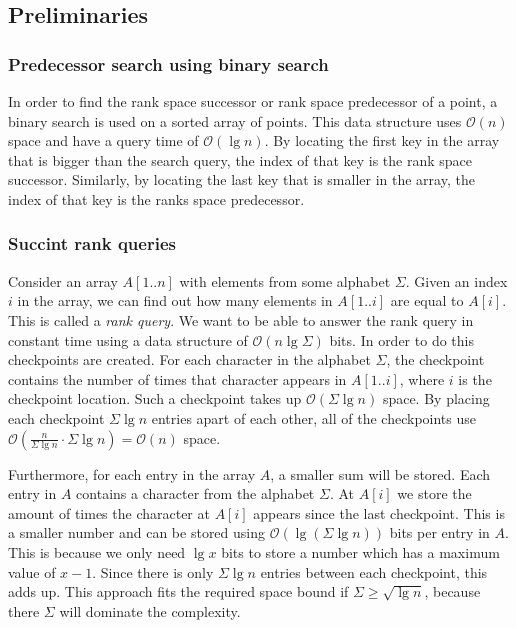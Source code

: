 \subsection{Preliminaries}

\subsubsection{Predecessor search using binary search}
In order to find the rank space successor or rank space predecessor of a point, a binary search is used on a sorted array of points. This data structure uses $\mathcal{O}(n)$ space and have a query time of $\mathcal{O}(\lg n)$. By locating the first key in the array that is bigger than the search query, the index of that key is the rank space successor. Similarly, by locating the last key that is smaller in the array, the index of that key is the ranks space predecessor.

\subsubsection{Succint rank queries}
Consider an array $A[1..n]$ with elements from some alphabet $\Sigma$. Given an index $i$ in the array, we can find out how many elements in $A[1..i]$ are equal to $A[i]$. This is called a \emph{rank query}. We want to be able to answer the rank query in constant time using a data structure of $\mathcal{O}(n \lg \Sigma)$ bits. In order to do this checkpoints are created. For each character in the alphabet $\Sigma$, the checkpoint contains the number of times that character appears in $A[1..i]$, where $i$ is the checkpoint location. Such a checkpoint takes up $\mathcal{O}(\Sigma \lg n)$ space. By placing each checkpoint $\Sigma \lg n$ entries apart of each other, all of the checkpoints use $\mathcal{O}(\frac{n}{\Sigma \lg n} \cdot \Sigma \lg n) = \mathcal{O}(n)$ space.

Furthermore, for each entry in the array $A$, a smaller sum will be stored. Each entry in $A$ contains a character from the alphabet $\Sigma$. At $A[i]$ we store the amount of times the character at $A[i]$ appears since the last checkpoint. This is a smaller number and can be stored using $\mathcal{O}(\lg (\Sigma \lg n))$ bits per entry in $A$. This is because we only need $\lg x$ bits to store a number which has a maximum value of $x-1$. Since there is only $\Sigma \lg n$ entries between each checkpoint, this adds up. This approach fits the required space bound if $\Sigma \geq \sqrt{\lg n}$, because there $\Sigma$ will dominate the complexity.

